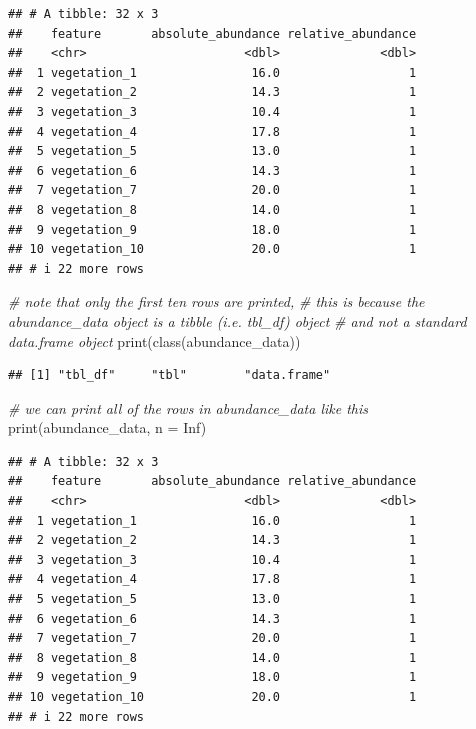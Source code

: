 \documentclass[
  12pt,
]{book}
\newenvironment{Shaded}{\begin{snugshade}}{\end{snugshade}}
\newcommand{\AttributeTok}[1]{\textcolor[rgb]{0.77,0.63,0.00}{#1}}
\newcommand{\CommentTok}[1]{\textcolor[rgb]{0.56,0.35,0.01}{\textit{#1}}}
\newcommand{\ConstantTok}[1]{\textcolor[rgb]{0.00,0.00,0.00}{#1}}
\newcommand{\FunctionTok}[1]{\textcolor[rgb]{0.00,0.00,0.00}{#1}}
\newcommand{\NormalTok}[1]{#1}
\begin{document}
\begin{verbatim}
## # A tibble: 32 x 3
##    feature       absolute_abundance relative_abundance
##    <chr>                      <dbl>              <dbl>
##  1 vegetation_1                16.0                  1
##  2 vegetation_2                14.3                  1
##  3 vegetation_3                10.4                  1
##  4 vegetation_4                17.8                  1
##  5 vegetation_5                13.0                  1
##  6 vegetation_6                14.3                  1
##  7 vegetation_7                20.0                  1
##  8 vegetation_8                14.0                  1
##  9 vegetation_9                18.0                  1
## 10 vegetation_10               20.0                  1
## # i 22 more rows
\end{verbatim}

\clearpage

\begin{Shaded}
\begin{Highlighting}[]
\CommentTok{\# note that only the first ten rows are printed,}
\CommentTok{\# this is because the abundance\_data object is a tibble (i.e. tbl\_df) object}
\CommentTok{\# and not a standard data.frame object}
\FunctionTok{print}\NormalTok{(}\FunctionTok{class}\NormalTok{(abundance\_data))}
\end{Highlighting}
\end{Shaded}

\begin{verbatim}
## [1] "tbl_df"     "tbl"        "data.frame"
\end{verbatim}

\begin{Shaded}
\begin{Highlighting}[]
\CommentTok{\# we can print all of the rows in abundance\_data like this}
\FunctionTok{print}\NormalTok{(abundance\_data, }\AttributeTok{n =} \ConstantTok{Inf}\NormalTok{)}
\end{Highlighting}
\end{Shaded}

\begin{verbatim}
## # A tibble: 32 x 3
##    feature       absolute_abundance relative_abundance
##    <chr>                      <dbl>              <dbl>
##  1 vegetation_1                16.0                  1
##  2 vegetation_2                14.3                  1
##  3 vegetation_3                10.4                  1
##  4 vegetation_4                17.8                  1
##  5 vegetation_5                13.0                  1
##  6 vegetation_6                14.3                  1
##  7 vegetation_7                20.0                  1
##  8 vegetation_8                14.0                  1
##  9 vegetation_9                18.0                  1
## 10 vegetation_10               20.0                  1
## # i 22 more rows
\end{verbatim}
\end{document}
